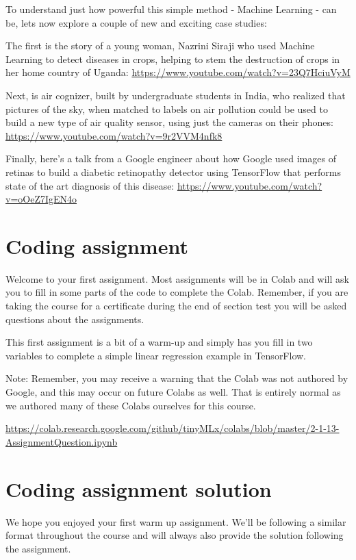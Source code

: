 To understand just how powerful this simple method - Machine Learning - can be, lets now explore a couple of new and exciting case studies:

The first is the story of a young woman, Nazrini Siraji who used Machine Learning to detect diseases in crops, helping to stem the destruction of crops in her home country of Uganda: \url{https://www.youtube.com/watch?v=23Q7HciuVyM}

Next, is air cognizer, built by undergraduate students in India, who realized that pictures of the sky, when matched to labels on air pollution could be used to build a new type of air quality sensor, using just the cameras on their phones: \url{https://www.youtube.com/watch?v=9r2VVM4nfk8}

Finally, here’s a talk from a Google engineer about how Google used images of retinas to build a diabetic retinopathy detector using TensorFlow that performs state of the art diagnosis of this disease: \url{https://www.youtube.com/watch?v=oOeZ7IgEN4o}


\section{Coding assignment}

Welcome to your first assignment. Most assignments will be in Colab and will ask you to fill in some parts of the code to complete the Colab. Remember, if you are taking the course for a certificate during the end of section test you will be asked questions about the assignments.

This first assignment is a bit of a warm-up and simply has you fill in two variables to complete a simple linear regression example in TensorFlow. 

Note: Remember, you may receive a warning that the Colab was not authored by Google, and this may occur on future Colabs as well. That is entirely normal as we authored many of these Colabs ourselves for this course.

\url{https://colab.research.google.com/github/tinyMLx/colabs/blob/master/2-1-13-AssignmentQuestion.ipynb}

\section{Coding assignment solution}

We hope you enjoyed your first warm up assignment. We’ll be following a similar format throughout the course and will always also provide the solution following the assignment.


